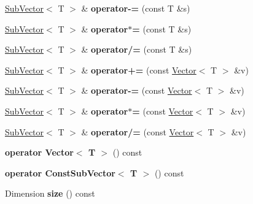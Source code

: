 \begin{DoxyCompactItemize}
\hyperlink{classTLAS_1_1SubVector}{Sub\+Vector}$<$ T $>$ \& {\bfseries operator-\/=} (const T \&s)
\item 
\mbox{\label{classTLAS_1_1SubVector_a7dec73cebabc9bc4461c9d965f69338c}} 
\hyperlink{classTLAS_1_1SubVector}{Sub\+Vector}$<$ T $>$ \& {\bfseries operator$\ast$=} (const T \&s)
\item 
\mbox{\label{classTLAS_1_1SubVector_aed550c74f917d8c417ad364a6a632487}} 
\hyperlink{classTLAS_1_1SubVector}{Sub\+Vector}$<$ T $>$ \& {\bfseries operator/=} (const T \&s)
\item 
\mbox{\label{classTLAS_1_1SubVector_a982fe700221945f72fcf6bf69c065bb4}} 
\hyperlink{classTLAS_1_1SubVector}{Sub\+Vector}$<$ T $>$ \& {\bfseries operator+=} (const \hyperlink{classTLAS_1_1Vector}{Vector}$<$ T $>$ \&v)
\item 
\mbox{\label{classTLAS_1_1SubVector_aadb03536b0bb9ad40b203589a9712beb}} 
\hyperlink{classTLAS_1_1SubVector}{Sub\+Vector}$<$ T $>$ \& {\bfseries operator-\/=} (const \hyperlink{classTLAS_1_1Vector}{Vector}$<$ T $>$ \&v)
\item 
\mbox{\label{classTLAS_1_1SubVector_a901f49dec0b05808dbf32b7766b25fe7}} 
\hyperlink{classTLAS_1_1SubVector}{Sub\+Vector}$<$ T $>$ \& {\bfseries operator$\ast$=} (const \hyperlink{classTLAS_1_1Vector}{Vector}$<$ T $>$ \&v)
\item 
\mbox{\label{classTLAS_1_1SubVector_ab91ca54b7b2f4ef70c19c4a0b362f8f9}} 
\hyperlink{classTLAS_1_1SubVector}{Sub\+Vector}$<$ T $>$ \& {\bfseries operator/=} (const \hyperlink{classTLAS_1_1Vector}{Vector}$<$ T $>$ \&v)
\item 
\mbox{\label{classTLAS_1_1SubVector_a1ec59485bf0ba531dea6390cafef5e0b}} 
{\bfseries operator Vector$<$ T $>$} () const
\item 
\mbox{\label{classTLAS_1_1SubVector_a12607e1da4e33bbee117e4f3deebbf7c}} 
{\bfseries operator Const\+Sub\+Vector$<$ T $>$} () const
\item 
\mbox{\label{classTLAS_1_1SubVector_a6a364450556f3caa7554976d3eaef7cc}} 
Dimension {\bfseries size} () const
\end{DoxyCompactItemize}
